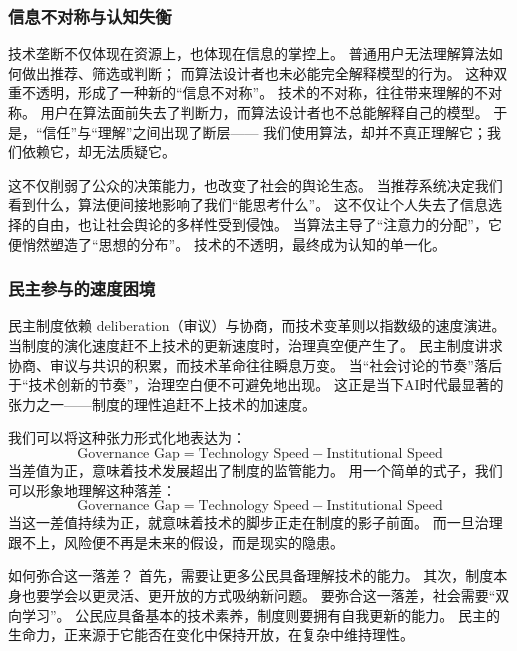 \subsubsection{信息不对称与认知失衡}

技术垄断不仅体现在资源上，也体现在信息的掌控上。  
普通用户无法理解算法如何做出推荐、筛选或判断；  
而算法设计者也未必能完全解释模型的行为。  
这种双重不透明，形成了一种新的“信息不对称”。  
技术的不对称，往往带来理解的不对称。  
用户在算法面前失去了判断力，而算法设计者也不总能解释自己的模型。  
于是，“信任”与“理解”之间出现了断层——  
我们使用算法，却并不真正理解它；我们依赖它，却无法质疑它。

这不仅削弱了公众的决策能力，也改变了社会的舆论生态。  
当推荐系统决定我们看到什么，算法便间接地影响了我们“能思考什么”。  
这不仅让个人失去了信息选择的自由，也让社会舆论的多样性受到侵蚀。  
当算法主导了“注意力的分配”，它便悄然塑造了“思想的分布”。  
技术的不透明，最终成为认知的单一化。

\subsubsection{民主参与的速度困境}

民主制度依赖 deliberation（审议）与协商，而技术变革则以指数级的速度演进。  
当制度的演化速度赶不上技术的更新速度时，治理真空便产生了。  
民主制度讲求协商、审议与共识的积累，而技术革命往往瞬息万变。  
当“社会讨论的节奏”落后于“技术创新的节奏”，治理空白便不可避免地出现。  
这正是当下AI时代最显著的张力之一——制度的理性追赶不上技术的加速度。

我们可以将这种张力形式化地表达为：
\begin{equation}
\text{Governance Gap} = \text{Technology Speed} - \text{Institutional Speed}
\end{equation}
当差值为正，意味着技术发展超出了制度的监管能力。  
用一个简单的式子，我们可以形象地理解这种落差：
\begin{equation}
\text{Governance Gap} = \text{Technology Speed} - \text{Institutional Speed}
\end{equation}
当这一差值持续为正，就意味着技术的脚步正走在制度的影子前面。  
而一旦治理跟不上，风险便不再是未来的假设，而是现实的隐患。

如何弥合这一落差？  
首先，需要让更多公民具备理解技术的能力。  
其次，制度本身也要学会以更灵活、更开放的方式吸纳新问题。  
要弥合这一落差，社会需要“双向学习”。  
公民应具备基本的技术素养，制度则要拥有自我更新的能力。  
民主的生命力，正来源于它能否在变化中保持开放，在复杂中维持理性。

